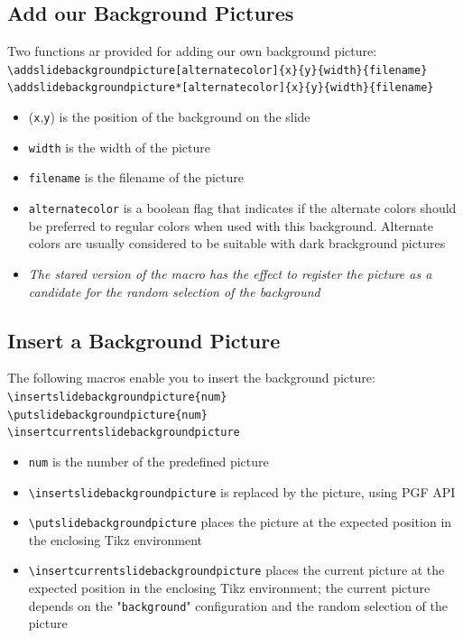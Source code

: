 \documentclass[english,sectioncirclenumberstyle]{ciadbeamer}
\begin{document}
\subsection{Add our Background Pictures}

\begin{frame}{\subsecname}
	Two functions ar provided for adding our own background picture: \\[.25cm]
	\texttt{{\textbackslash}addslidebackgroundpicture[alternatecolor]\{x\}\{y\}\{width\}\{filename\}} \\[.25cm]
	\texttt{{\textbackslash}addslidebackgroundpicture*[alternatecolor]\{x\}\{y\}\{width\}\{filename\}} \\[.25cm]
	\begin{itemize}
		\item (\texttt{x},\texttt{y}) is the position of the background on the slide
		\item \texttt{width} is the width of the picture
		\item \texttt{filename} is the filename of the picture
		\item \texttt{alternatecolor} is a boolean flag that indicates if the alternate colors should be preferred to regular colors when used with this background. Alternate colors are usually considered to be suitable with dark brackground pictures
		\item \emph{The stared version of the macro has the effect to register the picture as a candidate for the random selection of the background}
	\end{itemize}
\end{frame}

\subsection{Insert a Background Picture}

\begin{frame}{\subsecname}
	The following macros enable you to insert the background picture: \\[.25cm]
	\texttt{{\textbackslash}insertslidebackgroundpicture\{num\}} \\[.25cm]
	\texttt{{\textbackslash}putslidebackgroundpicture\{num\}} \\[.25cm]
	\texttt{{\textbackslash}insertcurrentslidebackgroundpicture} \\[.25cm]
	\begin{itemize}
		\item \texttt{num} is the number of the predefined picture
		\item \texttt{{\textbackslash}insertslidebackgroundpicture} is replaced by the picture, using PGF API
		\item \texttt{{\textbackslash}putslidebackgroundpicture} places the picture at the expected position in the enclosing Tikz environment
		\item \texttt{{\textbackslash}insertcurrentslidebackgroundpicture} places the current picture at the expected position in the enclosing Tikz environment; the current picture depends on the "\texttt{background}" configuration and the random selection of the picture
	\end{itemize}
\end{frame}
\end{document}
